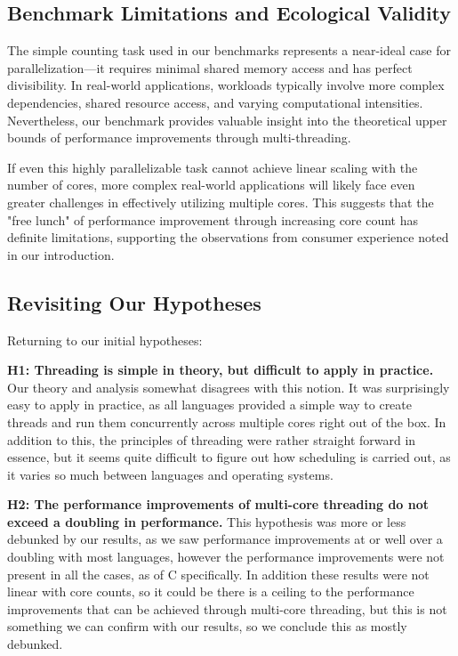 \documentclass[12pt,a4paper]{article}
\begin{document}
\subsection{Benchmark Limitations and Ecological Validity}

The simple counting task used in our benchmarks represents a near-ideal case for parallelization—it requires minimal shared memory access and has perfect divisibility. In real-world applications, workloads typically involve more complex dependencies, shared resource access, and varying computational intensities. Nevertheless, our benchmark provides valuable insight into the theoretical upper bounds of performance improvements through multi-threading.

If even this highly parallelizable task cannot achieve linear scaling with the number of cores, more complex real-world applications will likely face even greater challenges in effectively utilizing multiple cores. This suggests that the "free lunch" of performance improvement through increasing core count has definite limitations, supporting the observations from consumer experience noted in our introduction.

\subsection{Revisiting Our Hypotheses}

Returning to our initial hypotheses:

\textbf{H1: Threading is simple in theory, but difficult to apply in practice.}
Our theory and analysis somewhat disagrees with this notion. It was surprisingly easy to apply in practice, as all languages provided a simple way to create threads and run them concurrently across multiple cores right out of the box. In addition to this, the principles of threading were rather straight forward in essence, but it seems quite difficult to figure out how scheduling is carried out, as it varies so much between languages and operating systems. 

\textbf{H2: The performance improvements of multi-core threading do not exceed a doubling in performance.}
This hypothesis was more or less debunked by our results, as we saw performance improvements at or well over a doubling with most languages, however the performance improvements were not present in all the cases, as of C specifically. In addition these results were not linear with core counts, so it could be there is a ceiling to the performance improvements that can be achieved through multi-core threading, but this is not something we can confirm with our results, so we conclude this as mostly debunked.
\end{document}
